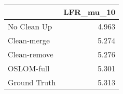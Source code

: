 \begin{tabular}{lr}
\toprule
{} & LFR_mu_10 \\
\midrule
No Clean Up  &     4.963 \\
Clean-merge  &     5.274 \\
Clean-remove &     5.276 \\
OSLOM-full   &     5.301 \\
Ground Truth &     5.313 \\
\bottomrule
\end{tabular}
